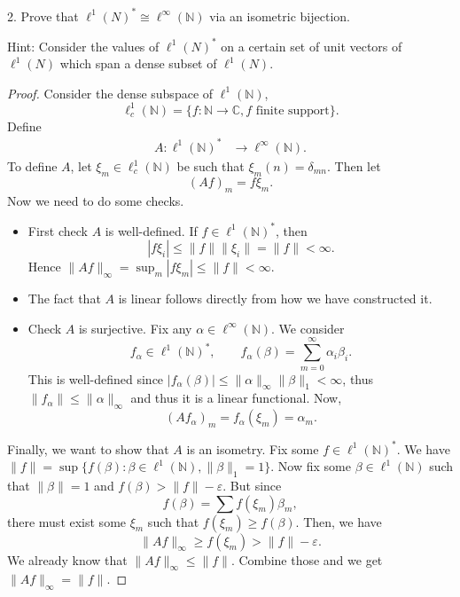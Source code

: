 \begin{problem}
	2. Prove that $\ell^1(N)^* \cong \ell^{\infty}(\mathbb{N})$ via an isometric bijection.

Hint: Consider the values of $\ell^1(N)^*$ on a certain set of unit vectors of $\ell^1(N)$ which span a dense subset of $\ell^1(N)$.
\end{problem}
\begin{proof}
	Consider the dense subspace of $\ell^1(\mathbb{N})$,
	\[
		\ell^1_c(\mathbb{N}) = \{f: \mathbb{N} \to \mathbb{C}, f \text{ finite support}\} 
	.\] 
	Define
	\begin{align*}
		A: \ell^1(\mathbb{N})^*  &\longrightarrow \ell^\infty (\mathbb{N}) 
	.\end{align*}
	To define $A$, let  $\xi_m \in \ell^1_c(\mathbb{N})$ be such that $\xi_m(n) = \delta_{m n}$. Then let
	\[
		(A f)_m = f \xi_m
	.\] 
	Now we need to do some checks.
	\begin{itemize}
		\item First check $A$ is well-defined. If $f \in \ell^1 (\mathbb{N})^*$, then
			\[
			\left| f \xi_i \right| \le \|f\| \|\xi_i\| = \|f\| < \infty 
			.\] 
			Hence $\|A f\|_{\infty } = \sup _m \left| f \xi_m \right| \le  \|f \| < \infty $.
		\item The fact that $A$ is linear follows directly from how we have constructed it. 
		\item Check $A$ is surjective. Fix any $\alpha \in \ell^\infty (\mathbb{N})$. We consider
			\[
				f_\alpha \in \ell^1(\mathbb{N})^*, \qquad
				f_\alpha(\beta) = \sum_{m = 0}^\infty \alpha_i \beta_i
			.\] 
			This is well-defined since $\left| f_\alpha(\beta) \right| \le \|\alpha\|_\infty  \|\beta\|_1 < \infty $, thus $\|f_\alpha\| \le \|\alpha\|_\infty $ and thus it is a linear functional. Now, 
			\[
				(A f_\alpha)_m = f_\alpha(\xi_m) = \alpha_m
			.\] 
	\end{itemize}
	Finally, we want to show that $A$ is an isometry. Fix some $f \in \ell^1(\mathbb{N})^{*}$. We have $\|f\| = \sup \{f(\beta): \beta \in \ell^1(\mathbb{N}), \|\beta\|_1 = 1\} $. Now fix some $ \beta \in \ell^1(\mathbb{N})$ such that $\|\beta\| = 1$ and $f(\beta) > \|f\| - \varepsilon$. But since
	\[
		f(\beta) = \sum f(\xi_m) \beta_m
	,\] 
	there must exist some $\xi_m$ such that $f(\xi_m) \ge f(\beta)$. Then, we have
	\[
		\|A f\|_\infty  \ge f(\xi_m) > \|f\| - \varepsilon
	.\] 
	We already know that $\|A f\|_\infty  \le  \|f\|$. Combine those and we get $\|A f\|_\infty  = \|f\|$.
\end{proof}



